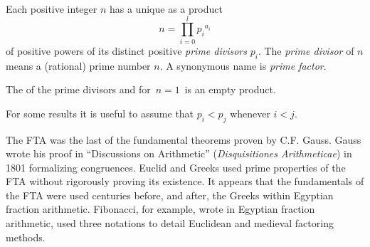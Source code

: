 \documentclass[12pt]{article}
\begin{document}
Each positive integer $n$ has a unique  as a product
\[
n = \prod_{i=0}^l {p_i}^{a_i}
\]
of positive powers of its distinct positive {\it prime divisors} $p_i$.  The {\it prime divisor} of $n$ means a (rational) prime number  $n$.  A synonymous name is {\it prime factor}. 

The  of the prime divisors and for\, $n=1$\, is an empty product.

For some results it is useful to assume that 
$p_i < p_j$ whenever $i < j$.

The FTA was the last of the fundamental theorems proven by C.F. Gauss. Gauss wrote his proof in ``Discussions on Arithmetic'' ({\em Disquisitiones Arithmeticae}) in 1801 formalizing congruences. Euclid and Greeks used prime properties of the FTA without rigorously proving its existence. It appears that the fundamentals of the FTA were used centuries before, and after, the Greeks within Egyptian fraction arithmetic. Fibonacci, for example, wrote in Egyptian fraction arithmetic, used three notations to detail Euclidean and medieval factoring methods.   
\end{document}
